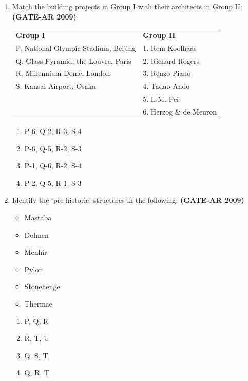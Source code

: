 \documentclass[a4paper,10pt]{article}
\begin{document}
\begin{enumerate}
    \item Match the building projects in Group I with their architects in Group II: \hfill \textbf{(GATE-AR 2009)} \\
    \begin{tabular}{ l l }
	\textbf{Group I} & \textbf{Group II} \\
	P. National Olympic Stadium, Beijing & 1. Rem Koolhaas \\
	Q. Glass Pyramid, the Louvre, Paris & 2. Richard Rogers \\
	R. Millennium Dome, London & 3. Renzo Piano \\
	S. Kansai Airport, Osaka & 4. Tadao Ando \\
	& 5. I. M. Pei \\
	& 6. Herzog \& de Meuron \\
	\end{tabular}
	\begin{multicols}{2}
	\begin{enumerate}
        \item P-6, Q-2, R-3, S-4
        \item P-6, Q-5, R-2, S-3
        \item P-1, Q-6, R-2, S-4
        \item P-2, Q-5, R-1, S-3
    \end{enumerate}
	\end{multicols}

    \item Identify the ‘pre-historic’ structures in the following: \hfill \textbf{(GATE-AR 2009)}
    \begin{itemize}
        \item Mastaba
        \item Dolmen
        \item Menhir
        \item Pylon
        \item Stonehenge
        \item Thermae
    \end{itemize}
    \begin{multicols}{4}
	\begin{enumerate}
        \item P, Q, R
        \item R, T, U
        \item Q, S, T
        \item Q, R, T
    \end{enumerate}
	\end{multicols}


\end{enumerate}
\end{document}

